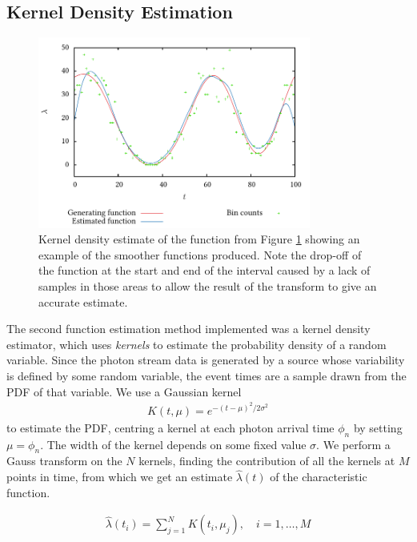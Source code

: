 \documentclass[11pt]{article}
\begin{document}
\subsection{Kernel Density Estimation}
\label{sec-3.2}

    \begin{figure}[h]
    \centering
    \includegraphics[width=0.8\textwidth]{images/kde}

    \caption{Kernel density estimate of the function from Figure
    \ref{fig:basecomp} showing an example of the smoother functions
    produced. Note the drop-off of the function at the start and end of the
    interval caused by a lack of samples in those areas to allow the result of
    the transform to give an accurate estimate.}

    \label{fig:basecomp}
    \end{figure}
   The second function estimation method implemented was a kernel density
   estimator, which uses \emph{kernels} to estimate the probability density of a
   random variable. Since the photon stream data is generated by a source whose
   variability is defined by some random variable, the event times are a sample
   drawn from the PDF of that variable. We use a Gaussian kernel
   \begin{align}
   K(t,\mu)=e^{-(t-\mu)^2/2\sigma^2}
   \end{align}
   to estimate the PDF, centring a kernel at each photon arrival time $\phi_n$ by
   setting $\mu=\phi_n$. The width of the kernel depends on some fixed value
   $\sigma$. We perform a Gauss transform on the $N$ kernels, finding the
   contribution of all the kernels at $M$ points in time, from which we get an
   estimate $\hat{\lambda}(t)$ of the characteristic function.

   \begin{align}
   \hat{\lambda}(t_i) = \sum_{j=1}^N K(t_i,\mu_j), \quad i=1,\dots,M
   \end{align}
\end{document}
